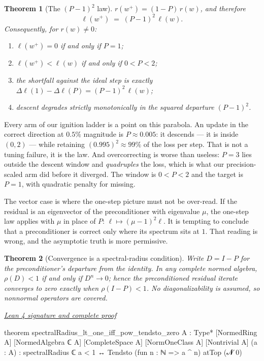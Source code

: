 \documentclass[11pt]{article}
\newtheorem{theorem}{Theorem}[section]
\newcommand{\leancommit}{f3a31db36bb2f944312ee31c1d86c2758109e83a}
\newcommand{\leansignaturelink}[2]{%
  \par\Needspace{0.3\textheight}\smallskip\noindent
  \href{https://github.com/zariuq/MeTTapedia/blob/\leancommit/#1\#L#2}{%
    \scriptsize\itshape Lean 4 signature and complete proof}\par\nobreak}
\begin{document}
\begin{theorem}[The $(P-1)^2$ law]\label{thm:precond}
$r(w^+) = (1-P)\,r(w)$, and therefore
\[
\ell(w^+) \;=\; (P-1)^2\, \ell(w).
\]
Consequently, for $r(w) \neq 0$:
\begin{enumerate}
\item $\ell(w^+) = 0$ \emph{if and only if} $P = 1$;
\item $\ell(w^+) < \ell(w)$ \emph{if and only if} $0 < P < 2$;
\item the shortfall against the ideal step is exactly
  $\Delta\ell(1) - \Delta\ell(P) = (P-1)^2\,\ell(w)$;
\item descent degrades strictly monotonically in the squared departure $(P-1)^2$.
\end{enumerate}
\end{theorem}

Every arm of our ignition ladder is a point on this parabola. An update in the correct
direction at $0.5\%$ magnitude is $P \approx 0.005$: it descends --- it is inside
$(0,2)$ --- while retaining $(0.995)^2 \approx 99\%$ of the loss per step. That is not a
tuning failure, it is the law. And overcorrecting is worse than useless: $P = 3$ lies
outside the descent window and \emph{quadruples} the loss, which is what our
precision-scaled arm did before it diverged. The window is $0 < P < 2$ and the target is
$P = 1$, with quadratic penalty for missing.

The vector case is where the one-step picture must not be over-read. If the residual is
an eigenvector of the preconditioner with eigenvalue $\mu$, the one-step law applies with
$\mu$ in place of $P$: $\ell \mapsto (\mu-1)^2 \ell$. It is tempting to conclude that a
preconditioner is correct only where its spectrum sits at $1$. That reading is wrong, and
the asymptotic truth is more permissive.

\begin{theorem}[Convergence is a spectral-radius condition]\label{thm:spectral}
Write $D = I - P$ for the preconditioner's departure from the identity. In any complete
normed algebra, $\rho(D) < 1$ if and only if $D^n \to 0$; hence the preconditioned
residual iterate converges to zero exactly when $\rho(I-P) < 1$. No diagonalizability is
assumed, so nonnormal operators are covered.
\end{theorem}

\leansignaturelink{lean/mettapedia/Mettapedia/MachineLearning/NeuralNetworks/%
PredictiveCoding/OperatorStability.lean}{22}
\begin{leansignature}
theorem spectralRadius_lt_one_iff_pow_tendsto_zero
    {A : Type*} [NormedRing A] [NormedAlgebra ℂ A] [CompleteSpace A]
    [NormOneClass A] [Nontrivial A] (a : A) :
    spectralRadius ℂ a < 1 ↔
      Tendsto (fun n : ℕ => a ^ n) atTop (𝓝 0)
\end{leansignature}
\end{document}
